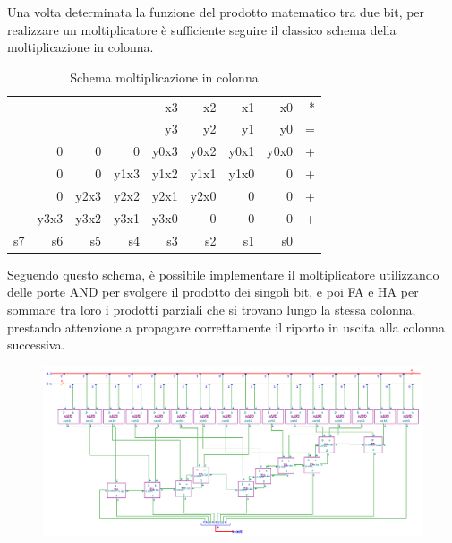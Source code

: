 \documentclass[10pt]{article}
\begin{document}
\begin{itemize}
Una volta determinata la funzione del prodotto matematico tra due bit, per realizzare un moltiplicatore è sufficiente seguire il classico schema della moltiplicazione in colonna.

\begin{table}[H]
    \begin{minipage}[c]{\textwidth}
    \centering
    \begin{tabular}{rrrrrrrrr}
       &       &       &       & x3    & x2    & x1    & x0    & * \\ 
       &       &       &       & y3    & y2    & y1    & y0    & = \\ \hline
       & 0     & 0     & 0     & y0x3  & y0x2  & y0x1  & y0x0  & + \\ 
       & 0     & 0     & y1x3  & y1x2  & y1x1  & y1x0  & 0     & + \\ 
       & 0     & y2x3  & y2x2  & y2x1  & y2x0  & 0     & 0     & + \\ 
       & y3x3  & y3x2  & y3x1  & y3x0  & 0     & 0     & 0     & + \\ \hline
    s7 & s6    & s5    & s4    & s3    & s2    & s1    & s0    &   \\ 
    \end{tabular}
    \caption{Schema moltiplicazione in colonna}
    \label{tab:my-table}
    \end{minipage}
\end{table}

Seguendo questo schema, è possibile implementare il moltiplicatore utilizzando delle porte AND per svolgere il prodotto dei singoli bit, e poi FA e HA per sommare tra loro i prodotti parziali che si
trovano lungo la stessa colonna, prestando attenzione a propagare correttamente il riporto in uscita alla colonna successiva. 

\begin{figure}[H]
    \includegraphics[width=\textwidth]{MUL}
    \centering
\end{figure}



\end{itemize}
\end{document}
